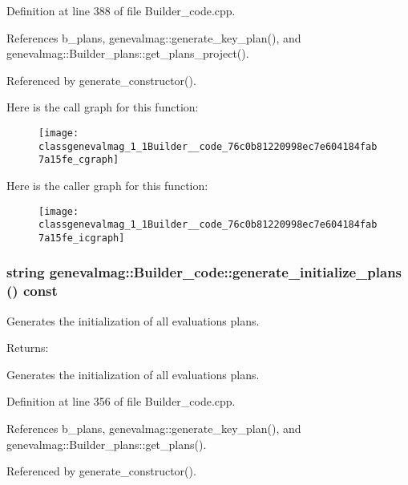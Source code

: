 Definition at line 388 of file Builder\_\-code.cpp.

References b\_\-plans, genevalmag::generate\_\-key\_\-plan(), and genevalmag::Builder\_\-plans::get\_\-plans\_\-project().

Referenced by generate\_\-constructor().

Here is the call graph for this function:\nopagebreak
\begin{figure}[H]
\begin{center}
\leavevmode
\texttt{[image: classgenevalmag\_1\_1Builder\_\_code\_76c0b81220998ec7e604184fab7a15fe\_cgraph]}
\end{center}
\end{figure}


Here is the caller graph for this function:\nopagebreak
\begin{figure}[H]
\begin{center}
\leavevmode
\texttt{[image: classgenevalmag\_1\_1Builder\_\_code\_76c0b81220998ec7e604184fab7a15fe\_icgraph]}
\end{center}
\end{figure}
\hypertarget{classgenevalmag_1_1Builder__code_4ff44b4aeb0d64f987f58754b997dbef}{
\subsubsection[{generate\_\-initialize\_\-plans}]{\setlength{\rightskip}{0pt plus 5cm}string genevalmag::Builder\_\-code::generate\_\-initialize\_\-plans () const}}
\label{classgenevalmag_1_1Builder__code_4ff44b4aeb0d64f987f58754b997dbef}


Generates the initialization of all evaluations plans. \begin{Desc}
\item[Returns:]\end{Desc}
Generates the initialization of all evaluations plans. 

Definition at line 356 of file Builder\_\-code.cpp.

References b\_\-plans, genevalmag::generate\_\-key\_\-plan(), and genevalmag::Builder\_\-plans::get\_\-plans().

Referenced by generate\_\-constructor().

